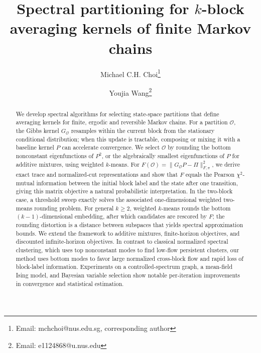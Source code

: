 \documentclass[11pt]{article}
\title{Spectral partitioning for $k$-block averaging kernels of finite Markov chains}
\author[1]{Michael C.H. Choi\thanks{Email: mchchoi@nus.edu.sg, corresponding author}}
\author[1]{Youjia Wang\thanks{Email: e1124868@u.nus.edu}}
\affil[1]{Department of Statistics and Data Science, National University of Singapore, Level 7, 6 Science Drive 2, 117546, Singapore}
\newcommand{\1}{\mathbf{1}}
\begin{document}
\maketitle

\begin{abstract}
We develop spectral algorithms for selecting state-space partitions
that define averaging kernels for finite, ergodic and reversible Markov
chains.  For a partition $\mathcal O$, the Gibbs kernel
$G_{\mathcal O}$ resamples within the current block from the
stationary conditional distribution; when this update is tractable,
composing or mixing it with a baseline kernel $P$ can accelerate
convergence.  We select $\mathcal O$ by rounding the bottom
nonconstant eigenfunctions of $P^2$, or the algebraically smallest
eigenfunctions of $P$ for additive mixtures, using weighted
$k$-means.  For
$F(\mathcal O)=\|G_{\mathcal O}P-\Pi\|_{F,\pi}^2$, we derive exact
trace and normalized-cut representations and show that $F$ equals the
Pearson $\chi^2$-mutual information between the initial block label
and the state after one transition, giving this matrix objective a
natural probabilistic interpretation.  In the two-block case, a
threshold sweep exactly solves the associated one-dimensional
weighted two-means rounding problem.  For general $k \geq 2$, weighted
$k$-means rounds the bottom $(k-1)$-dimensional embedding, after which
candidates are rescored by $F$; the rounding distortion is a distance
between subspaces that yields spectral approximation bounds.  We extend the framework to additive mixtures, finite-horizon objectives, and discounted infinite-horizon objectives.  In contrast to classical normalized spectral clustering, which uses top nonconstant modes to find
low-flow persistent clusters, our method uses bottom modes to favor
large normalized cross-block flow and rapid loss of block-label
information.  Experiments on a controlled-spectrum graph, a
mean-field Ising model, and Bayesian variable selection show
notable per-iteration improvements in convergence and statistical
estimation.

\end{abstract}
\end{document}
